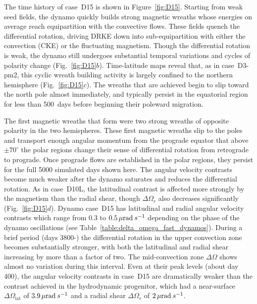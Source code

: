 The time history of case~D15 is shown in Figure~\ref{fig:D15}.
Starting from weak seed fields, the dynamo quickly builds strong
magnetic wreaths whose energies on average reach equipartition with
the convective flows.  These fields quench the differential rotation,
driving DRKE down into sub-equipartition with either the convection
(CKE) or the fluctuating magnetism.
Though the differential rotation is weak, the dynamo still undergoes
substantial temporal variations and cycles of polarity change
(Fig.~\ref{fig:D15}$b$).  Time-latitude maps reveal that, as in
case~D3-pm2, this cyclic wreath building activity is largely confined
to the northern hemisphere (Fig.~\ref{fig:D15}$c$).  The wreaths that
are achieved begin to slip toward the north pole almost immediately,
and typically persist in the equatorial region for less than 500~days
before beginning their poleward migration.

\clearpage
The first magnetic wreaths that form were two strong wreaths of opposite
polarity in the two hemispheres.  These first magnetic wreaths slip to the poles
and transport enough angular momentum from the prograde equator that
above $\pm 70^\circ$ the polar regions change their sense of
differential rotation from retrograde to prograde.  Once prograde
flows are established in the polar regions, they persist for the full
5000 simulated days shown here.  The angular velocity contrasts become
much weaker after the dynamo saturates and reduces the differential
rotation.  As in case~D10L, the latitudinal contrast is affected
more strongly by the magnetism than the radial shear, though $\Delta \Omega_r$
also decreases significantly (Fig.~\ref{fig:D15}$d$).  Dynamo case~D15 has
latitudinal and radial angular velocity contrasts which range from  
$0.3$ to $0.5\thinspace\mu \mathrm{rad}\: s^{-1}$ depending on the phase
of the dynamo oscillations (see Table~\ref{table:delta_omega_fast_dynamos}). 
During a brief period (days 3800\medspace-) the differential rotation in
the upper convection zone becomes substantially stronger, with both
the latitudinal and radial shear increasing by more than a factor of
two.  The mid-convection zone $\Delta \Omega$ shows almost no
variation during this interval. 
Even at their peak levels (about day 400), the angular velocity
contrasts in case~D15 are dramatically weaker than the contrast achieved in the
hydrodynamic progenitor, which had a near-surface $\Delta
\Omega_\mathrm{lat}$  of $3.9 \thinspace\mu \mathrm{rad}\: s^{-1}$ and
a radial shear $\Delta \Omega_r$ of $2 \thinspace\mu
\mathrm{rad}\: s^{-1}$.  

